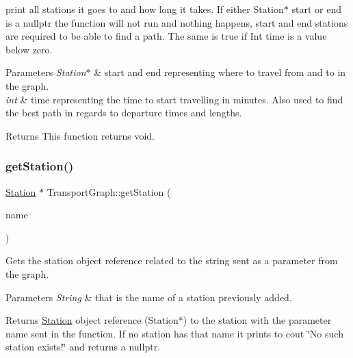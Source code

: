 print all stations it goes to and how long it takes. If either Station$\ast$ start or end is a nullptr the function will not run and nothing happens, start and end stations are required to be able to find a path. The same is true if Int time is a value below zero.


\begin{DoxyParams}{Parameters}
{\em Station$\ast$} & start and end representing where to travel from and to in the graph. \\
\hline
{\em int} & time representing the time to start travelling in minutes. Also used to find the best path in regards to departure times and lengths. \\
\hline
\end{DoxyParams}
\begin{DoxyReturn}{Returns}
This function returns void. 
\end{DoxyReturn}
\mbox{\label{class_transport_graph_a2ed30af16042cda3aa65b5b6b57deb62}} 
\subsubsection{\texorpdfstring{getStation()}{getStation()}}
{\footnotesize\ttfamily \mbox{\hyperlink{class_station}{Station}} $\ast$ Transport\+Graph\+::get\+Station (\begin{DoxyParamCaption}\item[{std\+::string}]{name }\end{DoxyParamCaption})}

Gets the station object reference related to the string sent as a parameter from the graph.


\begin{DoxyParams}{Parameters}
{\em String} & that is the name of a station previously added.\\
\hline
\end{DoxyParams}
\begin{DoxyReturn}{Returns}
\mbox{\hyperlink{class_station}{Station}} object reference (Station$\ast$) to the station with the parameter name sent in the function. If no station has that name it prints to cout \char`\"{}\+No such station exists!\char`\"{} and returns a nullptr. 
\end{DoxyReturn}
\mbox{\label{class_transport_graph_adcd1d4c8068b5b524cbd323061caf068}} 
